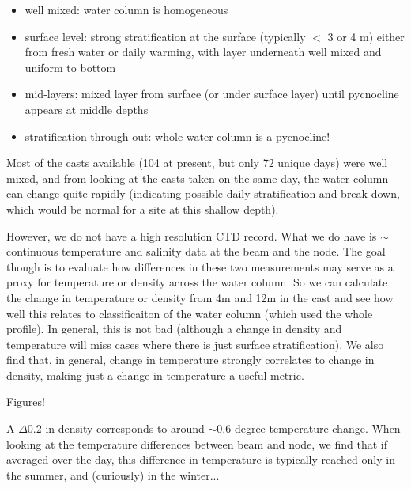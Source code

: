 \documentclass[11pt]{article}
\begin{document}
\begin{itemize}

\item well mixed: water column is homogeneous
\item surface level: strong stratification at the surface (typically $<$ 3 or 4 m) either from fresh water or daily warming, with layer underneath well mixed and uniform to bottom
\item mid-layers: mixed layer from surface (or under surface layer) until pycnocline appears at middle depths 
\item stratification through-out: whole water column is a pycnocline!
\end{itemize}

Most of the casts available (104 at present, but only 72 unique days) were well mixed, and from looking at the casts taken on the same day, the water column can change quite rapidly (indicating possible daily stratification and break down, which would be normal for a site at this shallow depth). 

However, we do not have a high resolution CTD record. What we do have is $\sim$ continuous temperature and salinity data at the beam and the node. The  goal though is to evaluate how differences in these two measurements may serve as a proxy for temperature or density across the water column. So we can calculate the change in temperature or density from 4m and 12m in the cast and see how well this relates to classificaiton of the water column (which used the whole profile). In general, this is not bad (although a change in density and temperature will miss cases where there is just surface stratification). We also find that, in general, change in temperature strongly correlates to change in density, making just a change in temperature a useful metric.

Figures!


A $\Delta0.2$ in density corresponds to around $\sim0.6$ degree temperature change. When looking at the temperature differences between beam and node, we find that if averaged over the day, this difference in temperature is typically reached only in the summer, and (curiously) in the winter...





\end{document}
